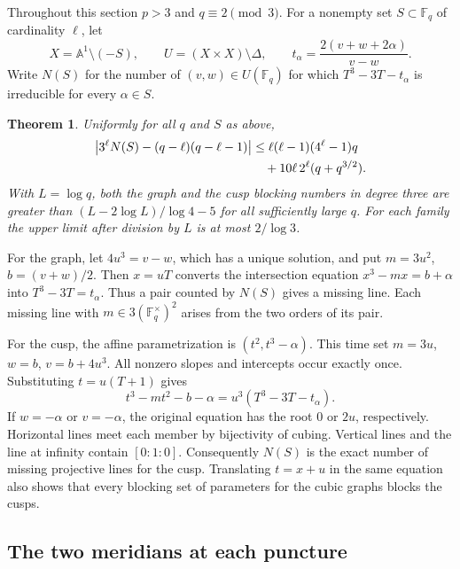 \documentclass[preprint,12pt,numbers]{elsarticle}
\newtheorem{theorem}{Theorem}[section]
\begin{document}
Throughout this section $p>3$ and $q\equiv2\pmod3$. For a nonempty
set $S\subset\mathbb F_q$ of cardinality $\ell$, let
\[
 X=\mathbb A^1\setminus(-S),\qquad U=(X\times X)\setminus\Delta,\qquad
 t_\alpha=\frac{2(v+w+2\alpha)}{v-w}.
\]
Write $N(S)$ for the number of $(v,w)\in U(\mathbb F_q)$ for which
$T^3-3T-t_\alpha$ is irreducible for every $\alpha\in S$.

\begin{theorem}\label{thm:cubic-surface}
Uniformly for all $q$ and $S$ as above,
\begin{align}
 \big|3^\ell N(S)-(q-\ell)(q-\ell-1)\big|
 &\le \ell(\ell-1)(4^\ell-1)q \notag\\
 &\quad +10\ell\,2^\ell(q+q^{3/2}).\label{eq:cubic-error}
\end{align}
With $L=\log q$, both the graph and the cusp blocking numbers in degree
three are greater than $(L-2\log L)/\log4-5$ for all sufficiently
large $q$. For each family the upper limit after division by $L$ is
at most $2/\log3$.
\end{theorem}

For the graph, let $4u^3=v-w$, which has a unique solution, and put
$m=3u^2$, $b=(v+w)/2$. Then $x=uT$ converts the intersection equation
$x^3-mx=b+\alpha$ into $T^3-3T=t_\alpha$. Thus a pair counted by $N(S)$
gives a missing line. Each missing line with $m\in3(\mathbb F_q^\times)^2$
arises from the two orders of its pair.

For the cusp, the affine parametrization is $(t^2,t^3-\alpha)$. This time
set $m=3u$, $w=b$, $v=b+4u^3$. All nonzero slopes and intercepts occur
exactly once. Substituting $t=u(T+1)$ gives
\[
  t^3-mt^2-b-\alpha =u^3(T^3-3T-t_\alpha).
\]
If $w=-\alpha$ or $v=-\alpha$, the original equation has the root $0$
or $2u$, respectively. Horizontal lines meet each member by bijectivity
of cubing. Vertical lines and the line at infinity contain $[0:1:0]$.
Consequently $N(S)$ is the exact number of missing projective lines for
the cusp. Translating $t=x+u$ in the same equation also shows that every
blocking set of parameters for the cubic graphs blocks the cusps.

\subsection{The two meridians at each puncture}
\end{document}
